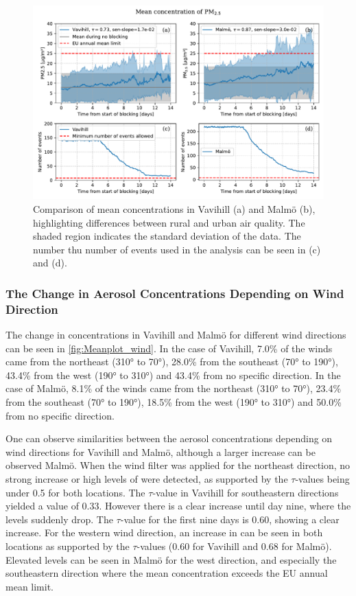 \begin{figure}[H]
    \centering
    \includegraphics[width=\textwidth]{Figures/Meanplot.pdf}
    \caption{Comparison of mean \PM  concentrations in Vavihill (a) and Malmö (b), highlighting differences between rural and urban air quality. The shaded region indicates the standard deviation of the data. The number thu number of events used in the analysis can be seen in (c) and (d).}
    \label{fig:Meanplot_Comparison}
\end{figure}

\subsubsection{The Change in Aerosol Concentrations Depending on Wind Direction}

The change in \PM concentrations in Vavihill and Malmö for different wind directions can be seen in \autoref{fig:Meanplot_wind}. In the case of Vavihill, 7.0\% of the winds came from the northeast (310° to 70°), 28.0\% from the southeast (70° to 190°), 43.4\% from the west (190° to 310°) and 43.4\% from no specific direction. In the case of Malmö, 8.1\% of the winds came from the northeast (310° to 70°), 23.4\% from the southeast (70° to 190°), 18.5\% from the west (190° to 310°) and 50.0\% from no specific direction. 

One can observe similarities between the aerosol concentrations depending on wind directions for Vavihill and Malmö, although a larger increase can be observed Malmö. When the wind filter was applied for the northeast direction, no strong increase or high levels of \PM  were detected, as supported by the $\tau$-values being under 0.5 for both locations. The $\tau$-value in Vavihill for southeastern directions yielded a value of 0.33. However there is a clear increase until day nine, where the levels suddenly drop. The $\tau$-value for the first nine days is 0.60, showing a clear increase. For the western wind direction, an increase in \PM can be seen in both locations as supported by the $\tau$-values (0.60 for Vavihill and 0.68 for Malmö). Elevated levels can be seen in Malmö for the west direction, and especially the southeastern direction where the mean concentration exceeds the EU annual mean limit. 

